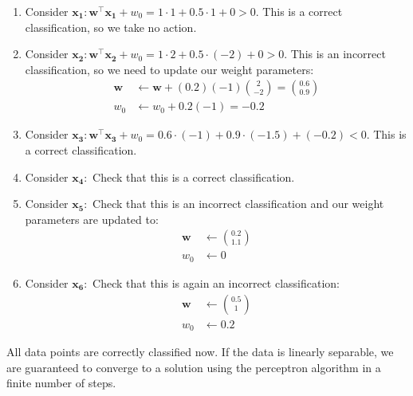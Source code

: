 \documentclass[12pt,letterpaper]{article}
\begin{document}
\begin{enumerate}
\begin{enumerate}
\item Consider $\mathbf{x_1}: \mathbf{w}^\top \mathbf{x_1} + w_0 = 1\cdot 1 + 0.5\cdot 1 + 0 > 0$. 
This is a correct classification, so we take no action.
\item Consider $\mathbf{x_2}: 
\mathbf{w}^\top \mathbf{x_2} + w_0 = 1\cdot 2 + 0.5 \cdot (-2) + 0 > 0$. 
This is an incorrect classification, so we need to update our weight parameters:
\begin{align*}
\mathbf{w} &\leftarrow \mathbf{w} + (0.2)(-1)\binom{2}{-2} = \binom{0.6}{0.9}\\
w_0 &\leftarrow w_0 + 0.2(-1) = -0.2
\end{align*}
\item Consider $\mathbf{x_3}: 
\mathbf{w}^\top \mathbf{x_3} + w_0 = 0.6 \cdot (-1) + 0.9 \cdot (-1.5) + (-0.2) < 0$. This is a correct classification.
\item Consider $\mathbf{x_4}:$ Check that this is a correct classification.
\item Consider $\mathbf{x_5}:$ Check that this is an incorrect classification 
and our weight parameters are updated to:
\begin{align*}
\mathbf{w} &\leftarrow \binom{0.2}{1.1}\\
w_0 &\leftarrow 0
\end{align*}
\item Consider $\mathbf{x_6}:$ Check that this is again an incorrect classification:
\begin{align*}
\mathbf{w} &\leftarrow \binom{0.5}{1}\\
w_0 &\leftarrow 0.2
\end{align*}
\end{enumerate}

\noindent All data points are correctly classified now. If the data is linearly separable, we are guaranteed to converge to a solution using the perceptron algorithm in a finite number of steps.

  \end{enumerate}
\end{document}
